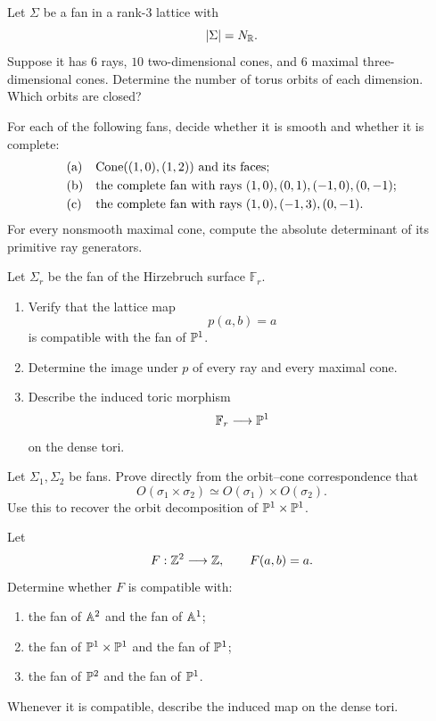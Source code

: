 \begin{exercises}
\item Let \(\Sigma\) be a fan in a rank-\(3\) lattice with
\[
|\Sigma|=N_{\mathbb{R}}.
\]
Suppose it has \(6\) rays, \(10\) two-dimensional cones, and \(6\)
maximal three-dimensional cones. Determine the number of torus orbits
of each dimension. Which orbits are closed?

\item For each of the following fans, decide whether it is smooth and
whether it is complete:
\[
\begin{array}{ll}
\text{(a)}&
\operatorname{Cone}((1,0),(1,2))\text{ and its faces};
\\[1mm]
\text{(b)}&
\text{the complete fan with rays }
(1,0),(0,1),(-1,0),(0,-1);
\\[1mm]
\text{(c)}&
\text{the complete fan with rays }
(1,0),(-1,3),(0,-1).
\end{array}
\]
For every nonsmooth maximal cone, compute the absolute determinant of
its primitive ray generators.

\item Let \(\Sigma_r\) be the fan of the Hirzebruch surface
\(\mathbb F_r\).
\begin{enumerate}[label=(\alph*),wide=0pt]
\item Verify that the lattice map
\[
p(a,b)=a
\]
is compatible with the fan of \(\mathbb{P}^1\).
\item Determine the image under \(p\) of every ray and every maximal
cone.
\item Describe the induced toric morphism
\[
\mathbb F_r\longrightarrow\mathbb{P}^1
\]
on the dense tori.
\end{enumerate}

\item Let \(\Sigma_1,\Sigma_2\) be fans. Prove directly from the
orbit--cone correspondence that
\[
O(\sigma_1\times\sigma_2)
\simeq
O(\sigma_1)\times O(\sigma_2).
\]
Use this to recover the orbit decomposition of
\(\mathbb{P}^1\times\mathbb{P}^1\).

\item Let
\[
F:\mathbb{Z}^2\longrightarrow\mathbb{Z},
\qquad
F(a,b)=a.
\]
Determine whether \(F\) is compatible with:
\begin{enumerate}[label=(\alph*),wide=0pt]
\item the fan of \(\mathbb{A}^2\) and the fan of \(\mathbb{A}^1\);
\item the fan of \(\mathbb{P}^1\times\mathbb{P}^1\) and the fan of \(\mathbb{P}^1\);
\item the fan of \(\mathbb{P}^2\) and the fan of \(\mathbb{P}^1\).
\end{enumerate}
Whenever it is compatible, describe the induced map on the dense
tori.


\end{exercises}
